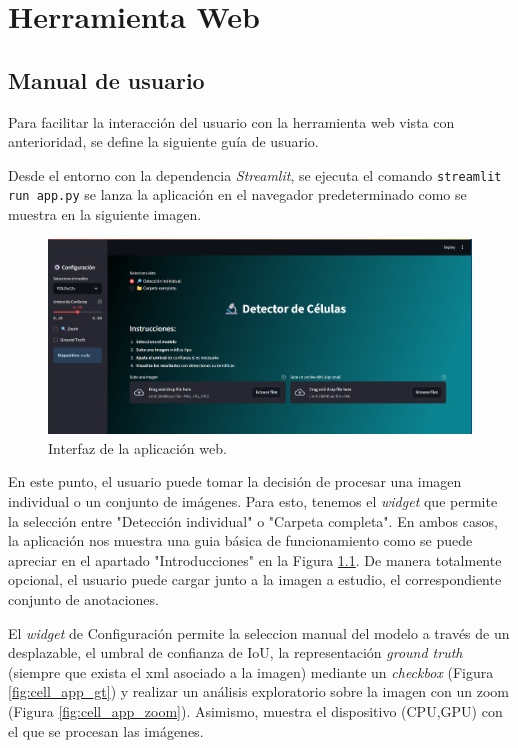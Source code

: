 \documentclass[12pt,a4paper,onecolumn,oneside]{report}
\begin{document}
\chapter{Herramienta Web} %
\label{Herramienta Web anexo}

\section{Manual de usuario}
\label{Manual de usuario}
Para facilitar la interacción del usuario con la herramienta web vista con anterioridad, se define la siguiente guía de usuario.

Desde el entorno con la dependencia \textit{Streamlit}, se ejecuta el comando \texttt{streamlit run app.py}  se lanza la aplicación en el navegador predeterminado
como se muestra en la siguiente imagen.

\begin{figure}[htbp]
  \centering
  \includegraphics[width=1.0\textwidth]{figuras/app/cell_app.png}
  \caption{Interfaz de la aplicación web.}
  \label{fig:cell_app}
\end{figure}

En este punto, el usuario puede tomar la decisión de procesar una imagen individual o un conjunto de imágenes. Para esto, 
tenemos el \textit{widget} que permite la selección entre "Detección individual" o "Carpeta completa". En ambos casos,
la aplicación nos muestra una guia básica de funcionamiento como se puede apreciar en el apartado "Introducciones" en la Figura \ref{fig:cell_app}.
De manera totalmente opcional, el usuario puede cargar junto a la imagen a estudio, el correspondiente conjunto de anotaciones.

El \textit{widget} de Configuración permite la seleccion manual del modelo a través de un desplazable, el umbral de confianza de IoU, 
la representación \textit{ground truth} (siempre que exista el xml asociado a la imagen) mediante un \textit{checkbox} (Figura \ref{fig:cell_app_gt}) y realizar un análisis exploratorio
sobre la imagen con un zoom (Figura \ref{fig:cell_app_zoom}). Asimismo, muestra el dispositivo (CPU,GPU) con el que se procesan las imágenes.
\end{document}
